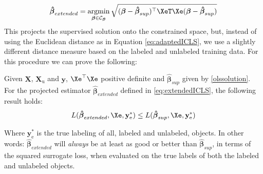 \begin{equation} \label{eq:extendedICLS}
\boldsymbol{\hat{\beta}}_{extended} = \operatorname*{argmin}_{\boldsymbol{\beta} \in \mathcal{C}_{\boldsymbol{\beta}}} \sqrt{(\boldsymbol{\beta}-\boldsymbol{\hat{\beta}}_{sup})^{\top} \XeT \Xe (\boldsymbol{\beta}-\boldsymbol{\hat{\beta}}_{sup})}
\end{equation}
This projects the supervised solution onto the constrained space, but, instead of using the Euclidean distance as in Equation \eqref{eq:adaptedICLS}, we use a slightly different distance measure based on the labeled and unlabeled training data. For this procedure we can prove the following:
\begin{theorem}
\label{th:robustness}
Given $\mathbf{X}$, $\mathbf{X}_\mathrm{u}$ and $\mathbf{y}$, $\Xe^\top \Xe$ positive definite and $\boldsymbol{\hat{\beta}}_{sup}$ given by \eqref{olssolution}. For the projected estimator $\boldsymbol{\hat{\beta}}_{extended}$ defined in \eqref{eq:extendedICLS}, the following result holds:
$$L(\boldsymbol{\hat{\beta}}_{extended},\Xe,\mathbf{y}_\mathrm{e}^{\ast}) \leq L(\boldsymbol{\hat{\beta}}_{sup},\Xe,\mathbf{y}_\mathrm{e}^{\ast}) $$
\end{theorem}
Where $\mathbf{y}_\text{e}^\ast$ is the true labeling of all, labeled and unlabeled, objects. In other words: $\boldsymbol{\hat{\beta}}_{extended}$ will \emph{always} be at least as good or better than $\boldsymbol{\hat{\beta}}_{sup}$, in terms of the squared surrogate loss, when evaluated on the true labels of both the labeled and unlabeled objects.


